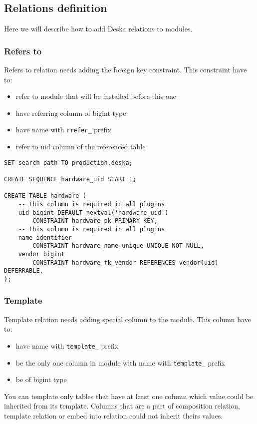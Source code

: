 \documentclass[deska]{subfiles}
\begin{document}
\subsection{Relations definition}
Here we will describe how to add Deska relations to modules.

\subsubsection{Refers to}
Refers to relation needs adding the foreign key constraint. This constraint have to:
\begin{itemize}
    \item refer to module that will be installed before this one
    \item have referring column of bigint type
    \item have name with {\tt rrefer\_} prefix
    \item refer to uid column of the referenced table
\end{itemize}

\begin{verbatim}
SET search_path TO production,deska;

CREATE SEQUENCE hardware_uid START 1;

CREATE TABLE hardware (
    -- this column is required in all plugins
    uid bigint DEFAULT nextval('hardware_uid')
        CONSTRAINT hardware_pk PRIMARY KEY,
    -- this column is required in all plugins
    name identifier
        CONSTRAINT hardware_name_unique UNIQUE NOT NULL,
    vendor bigint 
        CONSTRAINT hardware_fk_vendor REFERENCES vendor(uid) DEFERRABLE,
);
\end{verbatim}

\subsubsection{Template}
Template relation needs adding special column to the module. This column have to:
\begin{itemize}
    \item have name with {\tt template\_} prefix
    \item be the only one column in module with name with {\tt template\_} prefix
    \item be of bigint type
\end{itemize}
You can template only tables that have at least one column which value could be inherited from its template. Columns that are a part of composition relation, template relation or embed into relation could not inherit theirs values.
\end{document}
